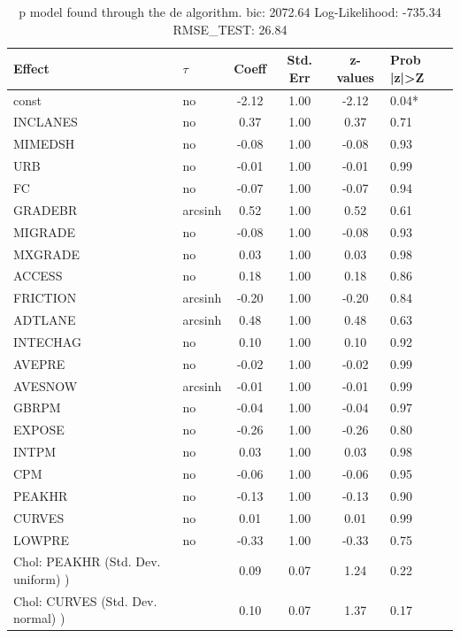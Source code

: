 \begin{table}
	\caption{p model found through the de algorithm. bic: 2072.64 Log-Likelihood: -735.34 RMSE_TEST: 26.84}
	\begin{center}
		\begin{tabular}{|l|l|c|c|c|l|}
			\hline
			Effect & $\tau$ & Coeff & Std. Err & z-values & Prob |z|>Z \\
			\hline
			const & no & -2.12 & 1.00 & -2.12 & 0.04* \\
			\hline
			INCLANES & no & 0.37 & 1.00 & 0.37 & 0.71 \\
			\hline
			MIMEDSH & no & -0.08 & 1.00 & -0.08 & 0.93 \\
			\hline
			URB & no & -0.01 & 1.00 & -0.01 & 0.99 \\
			\hline
			FC & no & -0.07 & 1.00 & -0.07 & 0.94 \\
			\hline
			GRADEBR & arcsinh & 0.52 & 1.00 & 0.52 & 0.61 \\
			\hline
			MIGRADE & no & -0.08 & 1.00 & -0.08 & 0.93 \\
			\hline
			MXGRADE & no & 0.03 & 1.00 & 0.03 & 0.98 \\
			\hline
			ACCESS & no & 0.18 & 1.00 & 0.18 & 0.86 \\
			\hline
			FRICTION & arcsinh & -0.20 & 1.00 & -0.20 & 0.84 \\
			\hline
			ADTLANE & arcsinh & 0.48 & 1.00 & 0.48 & 0.63 \\
			\hline
			INTECHAG & no & 0.10 & 1.00 & 0.10 & 0.92 \\
			\hline
			AVEPRE & no & -0.02 & 1.00 & -0.02 & 0.99 \\
			\hline
			AVESNOW & arcsinh & -0.01 & 1.00 & -0.01 & 0.99 \\
			\hline
			GBRPM & no & -0.04 & 1.00 & -0.04 & 0.97 \\
			\hline
			EXPOSE & no & -0.26 & 1.00 & -0.26 & 0.80 \\
			\hline
			INTPM & no & 0.03 & 1.00 & 0.03 & 0.98 \\
			\hline
			CPM & no & -0.06 & 1.00 & -0.06 & 0.95 \\
			\hline
			PEAKHR & no & -0.13 & 1.00 & -0.13 & 0.90 \\
			\hline
			CURVES & no & 0.01 & 1.00 & 0.01 & 0.99 \\
			\hline
			LOWPRE & no & -0.33 & 1.00 & -0.33 & 0.75 \\
			\hline
			 Chol: PEAKHR (Std. Dev. uniform) ) &  & 0.09 & 0.07 & 1.24 & 0.22 \\
			\hline
			 Chol: CURVES (Std. Dev. normal) ) &  & 0.10 & 0.07 & 1.37 & 0.17 \\

\end{tabular}
\end{center}
\end{table}
